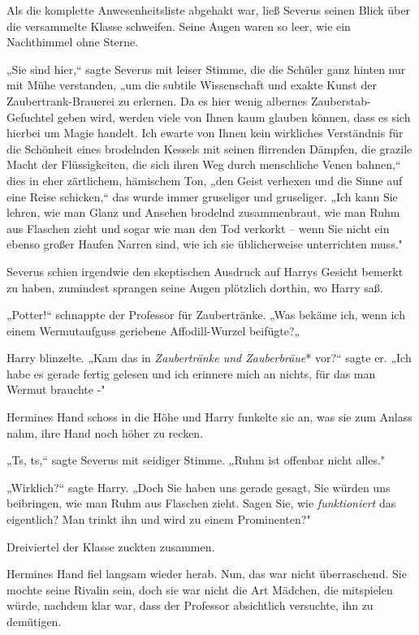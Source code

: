 {Als die komplette Anwesenheitsliste abgehakt war, ließ Severus seinen Blick über die versammelte Klasse schweifen. Seine Augen waren so leer, wie ein Nachthimmel ohne Sterne.

„Sie sind hier,“ sagte Severus mit leiser Stimme, die die Schüler ganz hinten nur mit Mühe verstanden, „um die subtile Wissenschaft und exakte Kunst der Zaubertrank-Brauerei zu erlernen. Da es hier wenig albernes Zauberstab-Gefuchtel geben wird, werden viele von Ihnen kaum glauben können, dass es sich hierbei um Magie handelt. Ich ewarte von Ihnen kein wirkliches Verständnis für die Schönheit eines brodelnden Kessels mit seinen flirrenden Dämpfen, die grazile Macht der Flüssigkeiten, die sich ihren Weg durch menschliche Venen bahnen,“ dies in eher zärtlichem, hämischem Ton, „den Geist verhexen und die Sinne auf eine Reise schicken,“ das wurde immer gruseliger und gruseliger. „Ich kann Sie lehren, wie man Glanz und Ansehen brodelnd zusammenbraut, wie man Ruhm aus Flaschen zieht und sogar wie man den Tod verkorkt -- wenn Sie nicht ein ebenso großer Haufen Narren sind, wie ich sie üblicherweise unterrichten muss."

Severus schien irgendwie den skeptischen Ausdruck auf Harrys Gesicht bemerkt zu haben, zumindest sprangen seine Augen plötzlich dorthin, wo Harry saß.

„Potter!“ schnappte der Professor für Zaubertränke. „Was bekäme ich, wenn ich einem Wermutaufguss geriebene Affodill-Wurzel beifügte?„

Harry blinzelte. „Kam das in \emph{Zaubertränke und Zauberbräue}* vor?“ sagte er. „Ich habe es gerade fertig gelesen und ich erinnere mich an nichts, für das man Wermut brauchte -"

Hermines Hand schoss in die Höhe und Harry funkelte sie an, was sie zum Anlass nahm, ihre Hand noch höher zu recken.

„Ts, ts,“ sagte Severus mit seidiger Stimme. „Ruhm ist offenbar nicht alles."

„Wirklich?“ sagte Harry. „Doch Sie haben uns gerade gesagt, Sie würden uns beibringen, wie man Ruhm aus Flaschen zieht. Sagen Sie, wie \emph{funktioniert} das eigentlich? Man trinkt ihn und wird zu einem Prominenten?"

Dreiviertel der Klasse zuckten zusammen.

Hermines Hand fiel langsam wieder herab. Nun, das war nicht überraschend. Sie mochte seine Rivalin sein, doch sie war nicht die Art Mädchen, die mitspielen würde, nachdem klar war, dass der Professor absichtlich versuchte, ihn zu demütigen.

}
